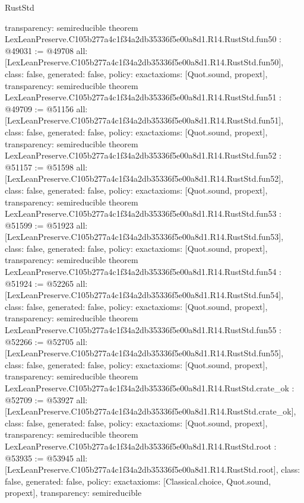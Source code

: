 \begin{lexlean}{RustStd}
\begin{coremodule}
{  transparency: semireducible
}
theorem LexLeanPreserve.C105b277a4c1f34a2db35336f5e00a8d1.R14.RustStd.fun50 : @49031 := @49708 {
  all: [LexLeanPreserve.C105b277a4c1f34a2db35336f5e00a8d1.R14.RustStd.fun50],
  class: false,
  generated: false,
  policy: exact{axioms: [Quot.sound, propext]},
  transparency: semireducible
}
theorem LexLeanPreserve.C105b277a4c1f34a2db35336f5e00a8d1.R14.RustStd.fun51 : @49709 := @51156 {
  all: [LexLeanPreserve.C105b277a4c1f34a2db35336f5e00a8d1.R14.RustStd.fun51],
  class: false,
  generated: false,
  policy: exact{axioms: [Quot.sound, propext]},
  transparency: semireducible
}
theorem LexLeanPreserve.C105b277a4c1f34a2db35336f5e00a8d1.R14.RustStd.fun52 : @51157 := @51598 {
  all: [LexLeanPreserve.C105b277a4c1f34a2db35336f5e00a8d1.R14.RustStd.fun52],
  class: false,
  generated: false,
  policy: exact{axioms: [Quot.sound, propext]},
  transparency: semireducible
}
theorem LexLeanPreserve.C105b277a4c1f34a2db35336f5e00a8d1.R14.RustStd.fun53 : @51599 := @51923 {
  all: [LexLeanPreserve.C105b277a4c1f34a2db35336f5e00a8d1.R14.RustStd.fun53],
  class: false,
  generated: false,
  policy: exact{axioms: [Quot.sound, propext]},
  transparency: semireducible
}
theorem LexLeanPreserve.C105b277a4c1f34a2db35336f5e00a8d1.R14.RustStd.fun54 : @51924 := @52265 {
  all: [LexLeanPreserve.C105b277a4c1f34a2db35336f5e00a8d1.R14.RustStd.fun54],
  class: false,
  generated: false,
  policy: exact{axioms: [Quot.sound, propext]},
  transparency: semireducible
}
theorem LexLeanPreserve.C105b277a4c1f34a2db35336f5e00a8d1.R14.RustStd.fun55 : @52266 := @52705 {
  all: [LexLeanPreserve.C105b277a4c1f34a2db35336f5e00a8d1.R14.RustStd.fun55],
  class: false,
  generated: false,
  policy: exact{axioms: [Quot.sound, propext]},
  transparency: semireducible
}
theorem LexLeanPreserve.C105b277a4c1f34a2db35336f5e00a8d1.R14.RustStd.crate_ok : @52709 := @53927 {
  all: [LexLeanPreserve.C105b277a4c1f34a2db35336f5e00a8d1.R14.RustStd.crate_ok],
  class: false,
  generated: false,
  policy: exact{axioms: [Quot.sound, propext]},
  transparency: semireducible
}
theorem LexLeanPreserve.C105b277a4c1f34a2db35336f5e00a8d1.R14.RustStd.root : @53935 := @53945 {
  all: [LexLeanPreserve.C105b277a4c1f34a2db35336f5e00a8d1.R14.RustStd.root],
  class: false,
  generated: false,
  policy: exact{axioms: [Classical.choice, Quot.sound, propext]},
  transparency: semireducible
}


\end{coremodule}
\end{lexlean}
